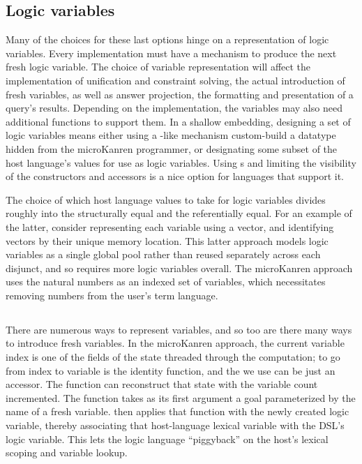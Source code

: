\documentclass[sigplan,balance=true,pbalance=true,natbib=false]{acmart}
\begin{document}
\subsection{Logic variables}

Many of the choices for these last options hinge on a representation
of logic variables. Every implementation must have a mechanism to
produce the next fresh logic variable. The choice of variable
representation will affect the implementation of unification and
constraint solving, the actual introduction of fresh variables, as
well as answer projection, the formatting and presentation of a
query's results. Depending on the implementation, the variables may
also need additional functions to support them. In a shallow
embedding, designing a set of logic variables means either using
a -like mechanism custom-build a datatype hidden
from the microKanren programmer, or designating some subset of the
host language's values for use as logic variables.
Using s and limiting the visibility of the
constructors and accessors is a nice option for languages that support
it.

The choice of which host language values to take for logic variables
divides roughly into the structurally equal and the referentially
equal. For an example of the latter, consider representing each
variable using a vector, and identifying vectors by their unique
memory location. This latter approach models logic variables as a
single global pool rather than reused separately across each disjunct,
and so requires more logic variables overall. The microKanren approach
uses the natural numbers as an indexed set of variables, which
necessitates removing numbers from the user's term language.

\subsection{}

There are numerous ways to represent variables, and so too are there
many ways to introduce fresh variables. In the microKanren approach,
the current variable index is one of the fields of the state threaded
through the computation; to go from index to variable is the identity
function, and the  we use can be just an
accessor. The function  can reconstruct that
state with the variable count incremented. The 
function takes as its first argument a goal parameterized by the name
of a fresh variable.  then applies that
function with the newly created logic variable, thereby associating
that host-language lexical variable with the DSL's logic variable.
This lets the logic language \enquote{piggyback} on the host's lexical
scoping and variable lookup.
\end{document}
